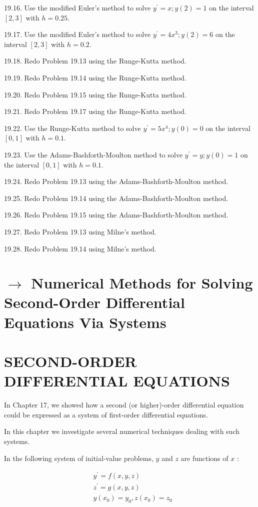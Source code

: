 \documentclass[10pt]{article}
\begin{document}
19.16. Use the modified Euler's method to solve $y^{\prime}=x ; y(2)=1$ on the interval $[2,3]$ with $h=0.25$.

19.17. Use the modified Euler's method to solve $y^{\prime}=4 x^{3} ; y(2)=6$ on the interval $[2,3]$ with $h=0.2$.

19.18. Redo Problem 19.13 using the Runge-Kutta method.

19.19. Redo Problem 19.14 using the Runge-Kutta method.

19.20. Redo Problem 19.15 using the Runge-Kutta method.

19.21. Redo Problem 19.17 using the Runge-Kutta method.

19.22. Use the Runge-Kutta method to solve $y^{\prime}=5 x^{4} ; y(0)=0$ on the interval $[0,1]$ with $h=0.1$.

19.23. Use the Adams-Bashforth-Moulton method to solve $y^{\prime}=y ; y(0)=1$ on the interval $[0,1]$ with $h=0.1$.

19.24. Redo Problem 19.13 using the Adams-Bashforth-Moulton method.

19.25. Redo Problem 19.14 using the Adams-Bashforth-Moulton method.

19.26. Redo Problem 19.15 using the Adams-Bashforth-Moulton method.

19.27. Redo Problem 19.13 using Milne's method.

19.28. Redo Problem 19.14 using Milne's method.

\section*{$\rightarrow$ Numerical Methods for Solving Second-Order Differential Equations Via Systems}
\section*{SECOND-ORDER DIFFERENTIAL EQUATIONS}
In Chapter 17, we showed how a second (or higher)-order differential equation could be expressed as a system of first-order differential equations.

In this chapter we investigate several numerical techniques dealing with such systems.

In the following system of initial-value problems, $y$ and $z$ are functions of $x$ :


\begin{align*}
& y^{\prime}=f(x, y, z) \\
& z^{\prime}=g(x, y, z)  \tag{20.1}\\
& y\left(x_{0}\right)=y_{0}, z\left(x_{0}\right)=z_{0}
\end{align*}
\end{document}
